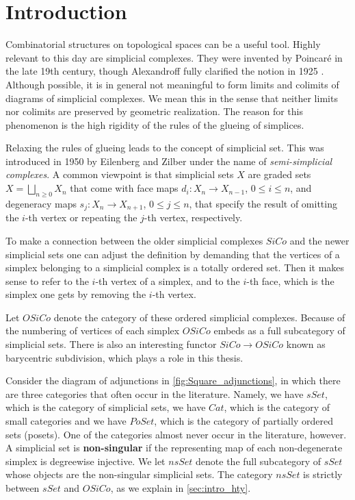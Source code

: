 \chapter{Introduction}
\label{ch:intro}

\noindent Combinatorial structures on topological spaces can be a useful tool. Highly relevant to this day are simplicial complexes. They were invented by Poincaré in the late 19th century, though Alexandroff fully clarified the notion in 1925 \cite{Al25}. Although possible, it is in general not meaningful to form limits and colimits of diagrams of simplicial complexes. We mean this in the sense that neither limits nor colimits are preserved by geometric realization. The reason for this phenomenon is the high rigidity of the rules of the glueing of simplices.

Relaxing the rules of glueing leads to the concept of simplicial set. This was introduced in 1950 by Eilenberg and Zilber \cite{EZ50} under the name of \emph{semi-simplicial complexes}. A common viewpoint is that simplicial sets $X$ are graded sets $X=\bigsqcup _{n\geq 0}X_n$ that come with face maps $d_i:X_n\to X_{n-1}$, $0\leq i\leq n$, and degeneracy maps $s_j:X_n\to X_{n+1}$, $0\leq j\leq n$, that specify the result of omitting the $i$-th vertex or repeating the $j$-th vertex, respectively.

To make a connection between the older simplicial complexes $SiCo$ and the newer simplicial sets one can adjust the definition by demanding that the vertices of a simplex belonging to a simplicial complex is a totally ordered set. Then it makes sense to refer to the $i$-th vertex of a simplex, and to the $i$-th face, which is the simplex one gets by removing the $i$-th vertex.

Let $OSiCo$ denote the category of these ordered simplicial complexes. Because of the numbering of vertices of each simplex $OSiCo$ embeds as a full subcategory of simplicial sets. There is also an interesting functor $SiCo\to OSiCo$ known as barycentric subdivision, which plays a role in this thesis.

Consider the diagram of adjunctions in \cref{fig:Square_adjunctions}, in which there are three categories that often occur in the literature. Namely, we have $sSet$, which is the category of simplicial sets, we have $Cat$, which is the category of small categories and we have $PoSet$, which is the category of partially ordered sets (posets). One of the categories almost never occur in the literature, however. A simplicial set is \textbf{non-singular} if the representing map of each non-degenerate simplex is degreewise injective. We let $nsSet$ denote the full subcategory of $sSet$ whose objects are the non-singular simplicial sets. The category $nsSet$ is strictly between $sSet$ and $OSiCo$, as we explain in \cref{sec:intro_hty}.

